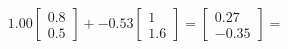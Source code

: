 \documentclass[preview]{standalone}
\begin{document}
\begin{align*}
1.00 \begin{bmatrix} 0.8 \\ 0.5 \end{bmatrix} + -0.53 \begin{bmatrix} 1 \\ 1.6 \end{bmatrix} = \begin{bmatrix} 0.27 \\ -0.35 \end{bmatrix} =
\end{align*}
\end{document}
